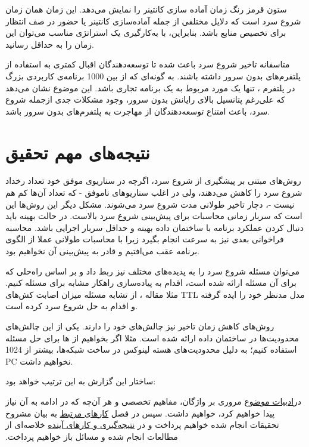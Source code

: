 \par
ستون قرمز رنگ زمان آماده سازی کانتینر را نمایش می‌دهد. این زمان همان زمان شروع سرد است که دلایل مختلفی از جمله آماده‌سازی کانتینر یا حضور در صف انتظار برای تخصیص منابع باشد. بنابراین، با به‌کارگیری یک استراتژی مناسب می‌توان این زمان را به حداقل رسانید. 

\par 
متاسفانه تاخیر شروع سرد باعث شده تا توسعه‌دهندگان اقبال کمتری به استفاده از پلتفرم‌های بدون سرور داشته باشند. به گونه‌ای که از بین 1000 برنامه‌ی کاربردی بزرگ در پلتفرم ، تنها یک مورد مربوط به یک برنامه تجاری باشد\cite{shahrad2020serverless}. این موضوع  نشان می‌دهد که علی‌رغم پتانسیل بالای رایانش بدون سرور، وجود مشکلات جدی ازجمله شروع سرد، باعث امتناع توسعه‌دهندگان از مهاجرت به پلتفرم‌های بدون سرور باشد. 

\par 
\section{نتیجه‌های مهم تحقیق}

روش‌های مبتنی بر پیشگیری از شروع سرد، اگرچه در سناریوی موفق خود تعداد رخداد شروع سرد را کاهش می‌دهند، ولی در اغلب سناریو‌های ناموفق - که تعداد آن‌ها کم هم نیست -، دچار تاخیر طولانی مدت شروع سرد می‌شوند. مشکل دیگر این روش‌ها این است که سربار زمانی محاسبات برای پیش‌بینی شروع سرد بالاست. در حالت بهینه باید دنبال کردن عملکرد برنامه با ساختمان داده بهینه و حداقل سربار اجرایی باشد. محاسبه فراخوانی بعدی نیز به سرعت انجام بگیرد زیرا با محاسبات طولانی عملا از الگوی برنامه عقب می‌افتیم و قادر به پیش‌بینی آن نخواهیم بود. 

می‌توان مسئله شروع سرد را به پدیده‌های مختلف نیز ربط داد و بر اساس راه‌حلی که برای آن مسئله ارائه شده است، اقدام به پیاده‌سازی راهکار مشابه برای مسئله کنیم. مثلا مقاله \cite{gias2020cocoa}، از تشابه مسئله میزان اصابت کش‌های TTL مدل مدنظر خود را ایده گرفته و اقدام به حل شروع سرد کرده است. 

روش‌های کاهش زمان تاخیر نیز چالش‌های خود را دارند. یکی از این چالش‌های محدودیت‌ها در ساختمان داده ارائه شده است. مثلا اگر بخواهیم از ها برای حل مسئله استفاده کنیم؛ به دلیل محدودیت‌های هسته لینوکس در ساخت شبکه‌ها، بیشتر از 1024 PC نخواهیم داشت. 

\par
\par
ساختار این گزارش به این ترتیب خواهد بود:‌

‫در\hyperref[literature] {ادبیات موضوع} مروری بر واژگان، مفاهیم تخصصی و هر آن‌چه که در ادامه به آن نیاز پیدا خواهیم کرد، خواهیم داشت. سپس در فصل
\hyperref[related-works]{کار‌های مرتبط}
  به بیان مشروح تحقیقات انجام شده خواهیم پرداخت و در  
\hyperref[conclusion]{نتیجه‌گیری و کار‌های آینده}
  خلاصه‌ای از مطالعات انجام شده و مسائل باز خواهیم پرداخت. ‬